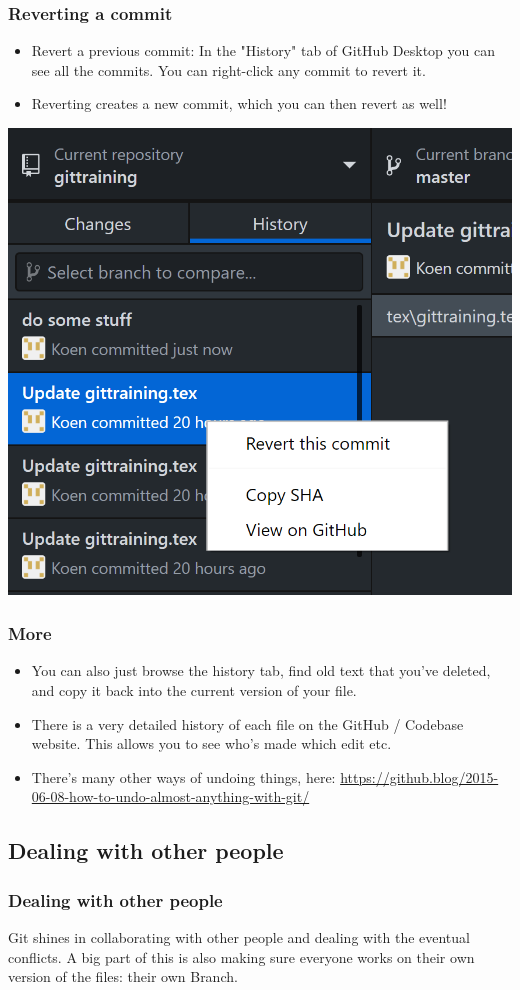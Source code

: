 \documentclass{beamer}
\begin{document}
\begin{frame}
	\frametitle{Reverting a commit}
	\begin{itemize}
		\item Revert a previous commit: In the "History" tab of GitHub Desktop you can see all the commits. You can right-click any commit to revert it. 
		\item Reverting creates a new commit, which you can then revert as well!
	\end{itemize}
	\hfill\includegraphics[width=0.5\linewidth]{figures/revertcommit.png}\hfill\strut
\end{frame}

\begin{frame}
	\frametitle{More}
	\begin{itemize}
		\item You can also just browse the history tab, find old text that you've deleted, and copy it back into the current version of your file.
		\item There is a very detailed history of each file on the GitHub / Codebase website. This allows you to see who's made which edit etc.
		\item There's many other ways of undoing things, here: \url{https://github.blog/2015-06-08-how-to-undo-almost-anything-with-git/}
	\end{itemize}
\end{frame}

\subsection{Dealing with other people}
\begin{frame}
\frametitle{Dealing with other people}
Git shines in collaborating with other people and dealing with the eventual conflicts. A big part of this is also making sure everyone works on their own version of the files: their own Branch.
\end{frame}
\end{document}
